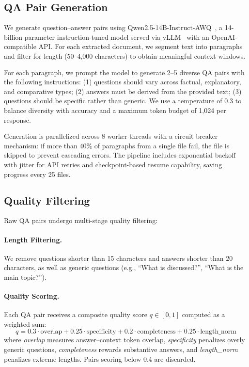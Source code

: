 \documentclass[11pt]{article}
\begin{document}
\subsection{QA Pair Generation}
\label{sec:qa_generation}

We generate question--answer pairs using Qwen2.5-14B-Instruct-AWQ~\citep{qwen2025qwen25}, a 14-billion parameter instruction-tuned model served via vLLM~\citep{kwon2023efficient} with an OpenAI-compatible API. For each extracted document, we segment text into paragraphs and filter for length (50--4,000 characters) to obtain meaningful context windows.

For each paragraph, we prompt the model to generate 2--5 diverse QA pairs with the following instructions: (1) questions should vary across factual, explanatory, and comparative types; (2) answers must be derived from the provided text; (3) questions should be specific rather than generic. We use a temperature of 0.3 to balance diversity with accuracy and a maximum token budget of 1,024 per response.

Generation is parallelized across 8 worker threads with a circuit breaker mechanism: if more than 40\% of paragraphs from a single file fail, the file is skipped to prevent cascading errors. The pipeline includes exponential backoff with jitter for API retries and checkpoint-based resume capability, saving progress every 25 files.

\subsection{Quality Filtering}
\label{sec:quality_filtering}

Raw QA pairs undergo multi-stage quality filtering:

\paragraph{Length Filtering.} We remove questions shorter than 15 characters and answers shorter than 20 characters, as well as generic questions (e.g., ``What is discussed?'', ``What is the main topic?'').

\paragraph{Quality Scoring.} Each QA pair receives a composite quality score $q \in [0, 1]$ computed as a weighted sum:
\begin{equation}
    q = 0.3 \cdot \text{overlap} + 0.25 \cdot \text{specificity} + 0.2 \cdot \text{completeness} + 0.25 \cdot \text{length\_norm}
\end{equation}
where \textit{overlap} measures answer--context token overlap, \textit{specificity} penalizes overly generic questions, \textit{completeness} rewards substantive answers, and \textit{length\_norm} penalizes extreme lengths. Pairs scoring below 0.4 are discarded.
\end{document}
